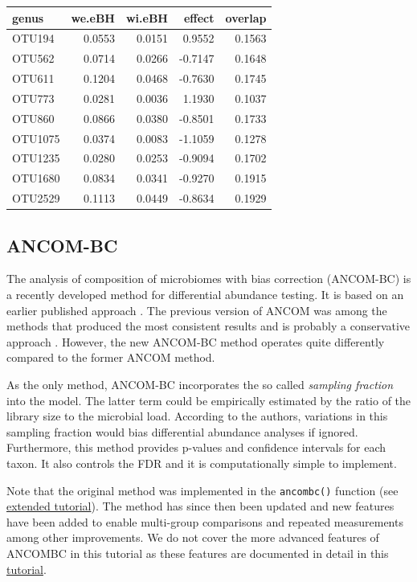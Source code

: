 \documentclass[
]{book}
\begin{document}
\begin{tabular}{l|r|r|r|r}
\hline
genus & we.eBH & wi.eBH & effect & overlap\\
\hline
OTU194 & 0.0553 & 0.0151 & 0.9552 & 0.1563\\
\hline
OTU562 & 0.0714 & 0.0266 & -0.7147 & 0.1648\\
\hline
OTU611 & 0.1204 & 0.0468 & -0.7630 & 0.1745\\
\hline
OTU773 & 0.0281 & 0.0036 & 1.1930 & 0.1037\\
\hline
OTU860 & 0.0866 & 0.0380 & -0.8501 & 0.1733\\
\hline
OTU1075 & 0.0374 & 0.0083 & -1.1059 & 0.1278\\
\hline
OTU1235 & 0.0280 & 0.0253 & -0.9094 & 0.1702\\
\hline
OTU1680 & 0.0834 & 0.0341 & -0.9270 & 0.1915\\
\hline
OTU2529 & 0.1113 & 0.0449 & -0.8634 & 0.1929\\
\hline
\end{tabular}

\hypertarget{ancom-bc}{%
\subsection{ANCOM-BC}\label{ancom-bc}}

The analysis of composition of microbiomes with bias correction
(ANCOM-BC) \citep{ancombc2020} is a recently developed method for differential
abundance testing. It is based on an earlier published approach
\citep{Mandal2015}. The previous version of ANCOM was among the methods
that produced the most consistent results and is probably a
conservative approach \citep{Nearing2022}. However, the new ANCOM-BC
method operates quite differently compared to the former ANCOM method.

As the only method, ANCOM-BC incorporates the so called \emph{sampling
fraction} into the model. The latter term could be empirically
estimated by the ratio of the library size to the microbial
load. According to the authors, variations in this sampling fraction
would bias differential abundance analyses if ignored. Furthermore,
this method provides p-values and confidence intervals for each
taxon. It also controls the FDR and it is computationally simple to
implement.

Note that the original method was implemented in the \texttt{ancombc()} function (see
\href{https://www.bioconductor.org/packages/release/bioc/vignettes/ANCOMBC/inst/doc/ANCOMBC.html}{extended tutorial}).
The method has since then been updated and new features have been added to enable
multi-group comparisons and repeated measurements among other improvements.
We do not cover the more advanced features of ANCOMBC in this tutorial
as these features are documented in detail in this
\href{https://www.bioconductor.org/packages/release/bioc/vignettes/ANCOMBC/inst/doc/ANCOMBC2.html}{tutorial}.
\end{document}
